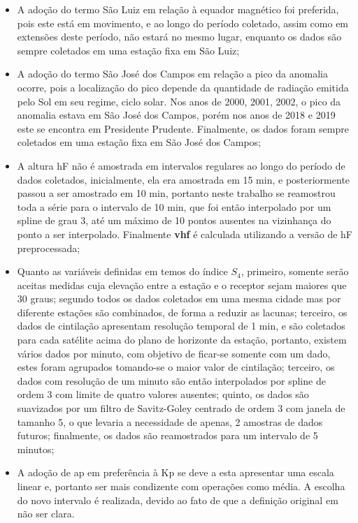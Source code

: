 \begin{itemize}
\item A adoção do termo São Luiz em relação à equador magnético foi preferida, pois este está em movimento, e ao longo do período coletado, assim como em extensões deste período, não estará no mesmo lugar, enquanto os dados são sempre coletados em uma estação fixa em São Luiz;
\item A adoção do termo São José dos Campos em relação a pico da anomalia ocorre, pois a localização do pico depende da quantidade de radiação emitida pelo Sol em seu regime, ciclo solar. Nos anos de 2000, 2001, 2002, o pico da anomalia estava em São José dos Campos, porém nos anos de 2018 e 2019 este se encontra em Presidente Prudente. Finalmente, os dados foram sempre coletados em uma estação fixa em São José dos Campos;
\item A altura hF não é amostrada em intervalos regulares ao longo do período de dados coletados, inicialmente, ela era amostrada em 15 min, e posteriormente passou a ser amostrado em 10 min, portanto neste trabalho se reamostrou toda a série para o intervalo de 10 min, que foi então interpolado por um spline de grau 3, até um máximo de 10 pontos ausentes na vizinhança do ponto a ser interpolado. Finalmente {\bf vhf} é calculada utilizando a versão de hF preprocessada;
\item Quanto as variáveis definidas em temos do índice $S_4$, primeiro, somente serão aceitas medidas cuja elevação entre a estação e o receptor sejam maiores que 30 graus; segundo todos os dados coletados em uma mesma cidade mas por diferente estações são combinados, de forma a reduzir as lacunas; terceiro, os dados de cintilação apresentam resolução temporal de 1 min, e são coletados para cada satélite acima do plano de horizonte da estação, portanto, existem vários dados por minuto, com objetivo de ficar-se somente com um dado, estes foram agrupados tomando-se o maior valor de cintilação; terceiro, os dados com resolução de um minuto são então interpolados por spline de ordem 3 com limite de quatro valores ausentes; quinto, os dados são suavizados por um filtro de Savitz-Goley centrado de ordem 3 com janela de tamanho 5, o que levaria a necessidade de apenas, 2 amostras de dados futuros; finalmente, os dados são reamostrados para um intervalo de 5 minutos;
\item A adoção de ap em preferência à Kp se deve a esta apresentar uma escala linear e, portanto ser mais condizente com operações como média. A escolha do novo intervalo é realizada, devido ao fato de que a definição original em \cite{REZENDE:2009} não ser clara.
\end{itemize}

